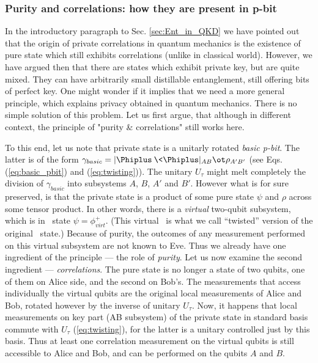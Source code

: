 \documentclass[twocolumn,aps,rmp]{revtex4}
\begin{document}
\subsubsection{Purity and correlations: how they are present in p-bit}
In the introductory paragraph to Sec. \ref{sec:Ent_in_QKD} we
have pointed out that the origin of private correlations in quantum
mechanics is the existence of pure state which still exhibits
correlations (unlike in classical world). However, we have
argued then that there are states which exhibit private key, but are
quite mixed. They can have arbitrarily small distillable
entanglement, still offering bits of perfect key. One might wonder if it implies that
we need a more general principle, which explains privacy obtained in quantum mechanics.
There is no simple solution of this problem. Let us first argue,
that although in different context, the principle of "purity \& correlations" still
works here.

To this end, let us note that private state is a unitarly rotated {\it
basic p-bit}. The latter is of the form $\gamma_{basic}=|\Phiplus\>\<\Phiplus|_{AB}\ot
\rho_{A'B'}$ (see Eqs. (\ref{eq:basic_pbit}) and (\ref{eq:twisting})). The unitary $U_{\tau}$ might melt completely the division of $\gamma_{basic}$ into
subsystems $A$, $B$, $A'$ and $B'$. However what is for sure
preserved, is that the private state is a product of some pure state
$\psi$  and $\rho$ across some tensor product. In other words, there
is a \emph{virtual} two-qubit subsystem, which is in \wsinglet\ state
$\psi=\phi^+_{virt}$. (This virtual \wsinglet\ is what we call
``twisted'' version of the original \wsinglet\ state.)  Because of
purity, the outcomes of any measurement performed on this virtual subsystem
are not known to Eve. Thus we already have one ingredient of the
principle --- the role of {\it purity}. Let us now examine the second
ingredient --- {\it correlations}. The pure state is no longer a state of two qubits, one of them on Alice side, and the second on Bob's. The measurements that access individually the virtual qubits are the original local measurements of Alice and Bob, rotated however by the inverse of unitary $U_{\tau}$. Now, it happens that local measurements on key part (AB subsystem) of the private state in standard basis commute with $U_{\tau}$ (\ref{eq:twisting}), for the latter is a unitary controlled just by this basis. Thus at least one correlation measurement on the virtual
qubits is still accessible to Alice and Bob, and can be performed on
the qubits $A$ and $B$.
\end{document}
